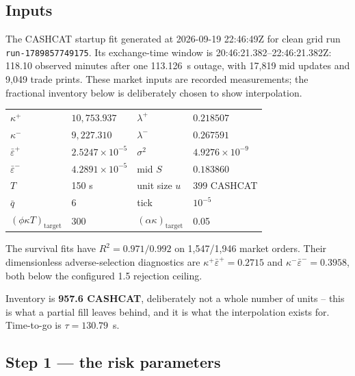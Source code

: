 \documentclass[11pt,a4paper]{article}
\newcommand{\epsb}{\bar{\varepsilon}}
\newcommand{\code}[1]{\texttt{\small #1}}
\begin{document}
\subsection{Inputs}

The CASHCAT startup fit generated at 2026-09-19 22:46:49Z for clean grid run
\code{run-1789857749175}. Its exchange-time window is
20:46:21.382--22:46:21.382Z: 118.10 observed minutes after one 113.126~s
outage, with 17,819 mid updates and 9,049 trade prints. These market inputs are
recorded measurements; the fractional inventory below is deliberately chosen to
show interpolation.

\begin{center}\small
\begin{tabular}{@{}llll@{}}
\toprule
$\kappa^{+}$ & $10{,}753.937$ & $\lambda^{+}$ & $0.218507$ \\
$\kappa^{-}$ & $9{,}227.310$  & $\lambda^{-}$ & $0.267591$ \\
$\epsb^{+}$  & $2.5247\times10^{-5}$ & $\sigma^{2}$ & $4.9276\times10^{-9}$ \\
$\epsb^{-}$  & $4.2891\times10^{-5}$ & mid $S$ & $0.183860$ \\
\midrule
$T$ & 150 s & unit size $u$ & $399$ CASHCAT \\
$\bar{q}$ & 6 & tick & $10^{-5}$ \\
$(\phi\kappa T)_{\text{target}}$ & 300 & $(\alpha\kappa)_{\text{target}}$ & 0.05 \\
\bottomrule
\end{tabular}
\end{center}

The survival fits have $R^2=0.971/0.992$ on 1,547/1,946 market orders. Their
dimensionless adverse-selection diagnostics are
$\kappa^{+}\epsb^{+}=0.2715$ and
$\kappa^{-}\epsb^{-}=0.3958$, both below the configured 1.5 rejection ceiling.

Inventory is \textbf{957.6 CASHCAT}, deliberately not a whole number of units --
this is what a partial fill leaves behind, and it is what the interpolation
exists for. Time-to-go is $\tau = 130.79$~s.

\subsection{Step 1 --- the risk parameters}
\end{document}
